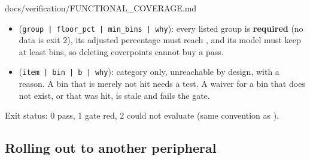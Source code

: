 \begin{relocated}{docs/verification/FUNCTIONAL_COVERAGE.md}
\begin{itemize}
\tightlist
\item
  (\texttt{group\ |\ floor\_\allowbreak{}pct\ |\ min\_\allowbreak{}bins\ |\ why}):
  every listed group is \textbf{required} (no data is exit 2), its
  adjusted percentage must reach , and its model must
  keep at least  bins, so deleting coverpoints cannot buy
  a pass.
\item
  (\texttt{item\ |\ bin\ |\ b\ |\ why}): category  only,
  unreachable by design, with a reason. A bin that is merely not hit
  needs a test. A waiver for a bin that does not exist, or that was hit,
  is stale and fails the gate.
\end{itemize}

Exit status: 0 pass, 1 gate red, 2 could not evaluate (same convention
as ).

\subsection{Rolling out to another peripheral}\label{tm:flow:functional-coverage:4-rolling-out-to-another-peripheral}


\end{relocated}
